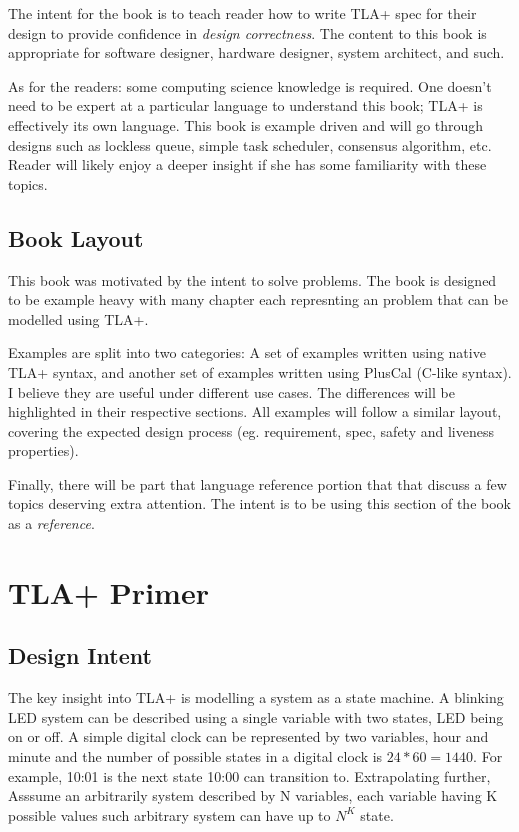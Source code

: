\documentclass{report}
\begin{document}
The intent for the book is to teach reader how to write TLA+ spec for their
design to provide confidence in \textit{design correctness}. The content to this
book is appropriate for software designer, hardware designer, system architect,
and such.\newline 

As for the readers: some computing science knowledge is required. One doesn't
need to be expert at a particular language to understand this book; TLA+ is
effectively its own language. This book is example driven and will go through
designs such as lockless queue, simple task scheduler, consensus algorithm, etc.
Reader will likely enjoy a deeper insight if she has some familiarity with these
topics.

\section{Book Layout}

This book was motivated by the intent to solve problems. The book is designed to
be example heavy with many chapter each represnting an problem that can be
modelled using TLA+.\newline

Examples are split into two categories: A set of examples written using native
TLA+ syntax, and another set of examples written using PlusCal (C-like syntax).
I believe they are useful under different use cases. The differences will be
highlighted in their respective sections. All examples will follow a similar 
layout, covering the expected design process (eg. requirement, spec, safety and
liveness properties). \newline

Finally, there will be part that language reference portion that that discuss a
few topics deserving extra attention. The intent is to be using this section of the 
book as a \textit{reference}.

\chapter{TLA+ Primer}

\section{Design Intent}

The key insight into TLA+ is modelling a system as a state machine. A blinking
LED system can be described using a single variable with two states, LED being
on or off. A simple digital clock can be represented by two variables, hour and
minute and the number of possible states in a digital clock is $24 * 60 = 1440$.
For example, 10:01 is the next state 10:00 can transition to.  Extrapolating
further, Asssume an arbitrarily system described by N variables, each variable
having K possible values such arbitrary system can have up to $N^K$
state.\newline
\end{document}
